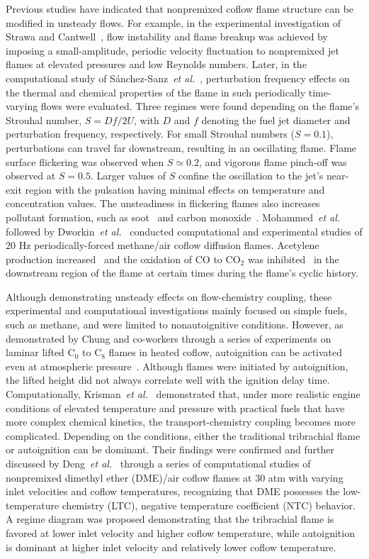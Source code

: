 \documentclass[review,3p,times]{elsarticle}
\begin{document}
Previous studies have indicated that nonpremixed coflow flame structure can be modified in unsteady flows.  For example, in the experimental investigation of Strawa and Cantwell~\cite{strawa89}, flow instability and flame breakup was achieved by imposing a small-amplitude, periodic velocity fluctuation to nonpremixed jet flames at elevated pressures and low Reynolds numbers.  Later, in the computational study of S\'{a}nchez-Sanz~\emph{et al.}~\cite{sanchezsanz10}, perturbation frequency effects on the thermal and chemical properties of the flame in such periodically time-varying flows were evaluated.  Three regimes were found depending on the flame's Strouhal number, $S = Df/2U$, with $D$ and $f$ denoting the fuel jet diameter and perturbation frequency, respectively.  For small Strouhal numbers ($S = 0.1$), perturbations can travel far downstream, resulting in an oscillating flame.  Flame surface flickering was observed when $S\simeq 0.2$, and vigorous flame pinch-off was observed at $S = 0.5$.  Larger values of $S$ confine the oscillation to the jet's near-exit region with the pulsation having minimal effects on temperature and concentration values.  The unsteadiness in flickering flames also increases pollutant formation, such as soot~\cite{shaddix94} and carbon monoxide~\cite{skaggs96}.  Mohammed~\emph{et al.}~\cite{mohammed98} followed by Dworkin~\emph{et al.}~\cite{dworkin07} conducted computational and experimental studies of $20$ Hz periodically-forced methane/air coflow diffusion flames.  Acetylene production increased~\cite{mohammed98} and the oxidation of CO to CO$_2$ was inhibited~\cite{dworkin07} in the downstream region of the flame at certain times during the flame's cyclic history.       

Although demonstrating unsteady effects on flow-chemistry coupling, these experimental and computational investigations mainly focused on simple fuels, such as methane, and were limited to nonautoignitive conditions.  \textcolor{Rev1}{However, as demonstrated by Chung and co-workers through a series of experiments on laminar lifted C{$_0$} to C{$_8$} flames in heated coflow, autoignition can be activated even at atmospheric pressure~\cite{choi10,ainoman15}.  Although flames were initiated by autoignition, the lifted height did not always correlate well with the ignition delay time.  Computationally, Krisman~\emph{et al.}~\cite{krisman14} demonstrated that, under more realistic engine conditions of elevated temperature and pressure with practical fuels that have more complex chemical kinetics, the transport-chemistry coupling becomes more complicated.  Depending on the conditions, either the traditional tribrachial flame or autoignition can be dominant.}  Their findings were confirmed and further discussed by Deng~\emph{et al.}~\cite{deng15,deng15b} through a series of computational studies of nonpremixed dimethyl ether (DME)/air coflow flames at $30$ atm with varying inlet velocities and coflow temperatures, recognizing that DME possesses the low-temperature chemistry (LTC), negative temperature coefficient (NTC) behavior.  A regime diagram was proposed demonstrating that the tribrachial flame is favored at lower inlet velocity and higher coflow temperature, while autoignition is dominant at higher inlet velocity and relatively lower coflow temperature.
\end{document}
